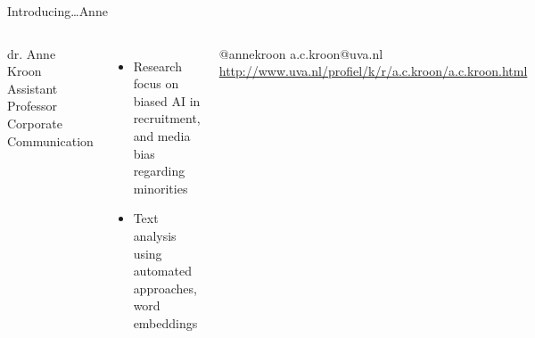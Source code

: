 \documentclass[handout]{beamer}
\begin{document}
\begin{frame}{Introducing\ldots \huge{Anne}} 
	\begin{columns}[]    dr. Anne Kroon \\ 
		Assistant Professor Corporate Communication
		\begin{itemize} 
			\item Research focus on biased AI in recruitment, and media bias regarding minorities
			\item Text analysis using automated approaches, word embeddings
		\end{itemize} @annekroon \textbar a.c.kroon@uva.nl  \textbar \url{http://www.uva.nl/profiel/k/r/a.c.kroon/a.c.kroon.html} 
	\end{columns} 
\end{frame}
\end{document}
